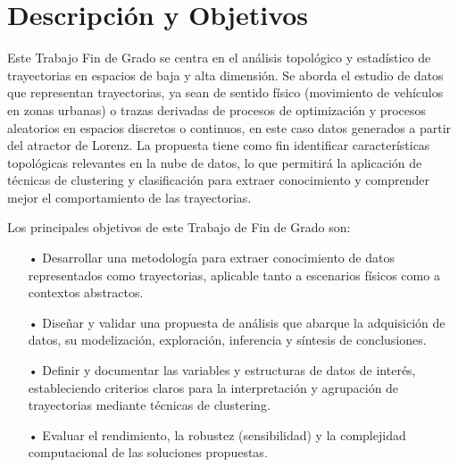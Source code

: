 



\renewcommand{\TituloTFG}{ Plan de Trabajo}




\chapter*{Descripción y Objetivos}

Este Trabajo Fin de Grado se centra en el análisis topológico y estadístico de trayectorias en espacios de baja y alta dimensión. Se aborda el estudio de datos que representan trayectorias, ya sean de sentido físico (movimiento de vehículos en zonas urbanas) o trazas derivadas de procesos de optimización y procesos aleatorios en espacios discretos o continuos, en este caso datos generados a partir del atractor de Lorenz. La propuesta tiene como fin identificar características topológicas relevantes en la nube de datos, lo que permitirá la aplicación de técnicas de clustering y clasificación para extraer conocimiento y comprender mejor el comportamiento de las trayectorias.

Los principales objetivos de este Trabajo de Fin de Grado son: 
\begin{itemize} 
\item[•] Desarrollar una metodología para extraer conocimiento de datos representados como trayectorias, aplicable tanto a escenarios físicos como a contextos abstractos. \item[•] Diseñar y validar una propuesta de análisis que abarque la adquisición de datos, su modelización, exploración, inferencia y síntesis de conclusiones. 
\item[•] Definir y documentar las variables y estructuras de datos de interés, estableciendo criterios claros para la interpretación y agrupación de trayectorias mediante técnicas de clustering. 
\item[•] Evaluar el rendimiento, la robustez (sensibilidad) y la complejidad computacional de las soluciones propuestas. 
\end{itemize}

